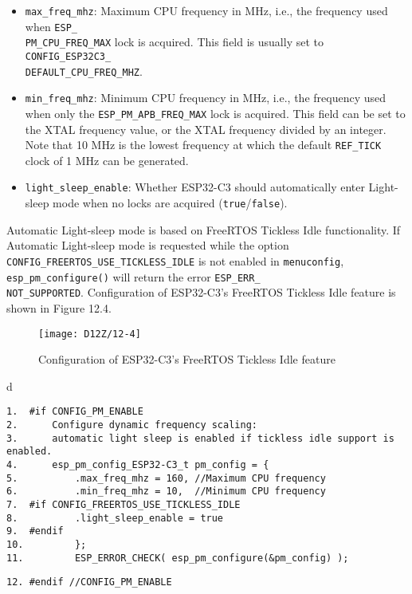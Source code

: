 \documentclass[a4paper,12pt]{book}
\begin{document}
\begin{itemize}[leftmargin=1em]
    \item \verb|max_freq_mhz|: Maximum CPU frequency in MHz, i.e., the frequency used when \verb|ESP_|\\ \verb|PM_CPU_FREQ_MAX| lock is acquired. This field is usually set to \verb|CONFIG_ESP32C3_|\\ \verb|DEFAULT_CPU_FREQ_MHZ|.
    \item \verb|min_freq_mhz|: Minimum CPU frequency in MHz, i.e., the frequency used when only the \verb|ESP_PM_APB_FREQ_MAX| lock is acquired. This field can be set to the XTAL frequency value, or the XTAL frequency divided by an integer. Note that 10 MHz is the lowest frequency at which the default \verb|REF_TICK| clock of 1 MHz can be generated.
    \item \verb|light_sleep_enable|: Whether ESP32-C3 should automatically enter Light-sleep mode when no locks are acquired (\verb|true|/\verb|false|).
\end{itemize}

Automatic Light-sleep mode is based on FreeRTOS Tickless Idle functionality. If Automatic Light-sleep mode is requested while the option \verb|CONFIG_FREERTOS_USE_TICKLESS_IDLE| is not enabled in \verb|menuconfig|, \verb|esp_pm_configure()| will return the error \verb|ESP_ERR_|\\ \verb|NOT_SUPPORTED|. Configuration of ESP32-C3’s FreeRTOS Tickless Idle feature is shown in Figure 12.4.

\begin{figure}[!h]
    \centering
    \texttt{[image: D12Z/12-4]}
    \caption{Configuration of ESP32-C3’s FreeRTOS Tickless Idle feature}
\end{figure}

\begin{codebloc}
\begin{tabular}{d}
\vspace{2pt}
\begin{verbatim}
1.  #if CONFIG_PM_ENABLE
2.      Configure dynamic frequency scaling:
3.      automatic light sleep is enabled if tickless idle support is enabled.
4.      esp_pm_config_ESP32-C3_t pm_config = {
5.          .max_freq_mhz = 160, //Maximum CPU frequency
6.          .min_freq_mhz = 10,  //Minimum CPU frequency
7.  #if CONFIG_FREERTOS_USE_TICKLESS_IDLE
8.          .light_sleep_enable = true
9.  #endif
10.         };
11.         ESP_ERROR_CHECK( esp_pm_configure(&pm_config) );
\end{verbatim}
\verb|12. #endif //CONFIG_PM_ENABLE|
\end{tabular}
\end{codebloc}
\end{document}
